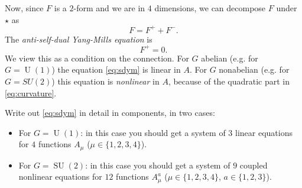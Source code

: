 \documentclass[12pt,letterpaper,reqno]{article}
\numberwithin{equation}{section}
\newcommand{\de}{\mathrm{d}}
\newcommand{\ti}[1]{\textit{#1}}
\DeclareMathOperator{\SU}{SU}
\DeclareMathOperator{\U}{U}
\begin{document}
Now, since $F$ is a $2$-form and we are in $4$ dimensions,
we can decompose $F$ under $\star$ as
\begin{equation}
  F = F^+ + F^-.
\end{equation}
The \ti{anti-self-dual Yang-Mills equation} is
\begin{equation} \label{eq:sdym}
  F^+ = 0.
\end{equation}
We view this as a condition on the connection.
For $G$ abelian (e.g. for $G = \U(1)$) the equation \eqref{eq:sdym} is linear in $A$.
For $G$ nonabelian (e.g. for $G = SU(2)$) this
equation is \ti{nonlinear} in $A$, because of the quadratic part in \eqref{eq:curvature}.

\begin{exercise} Write out \eqref{eq:sdym} in detail in components, in two cases:
\begin{itemize}
  \item For $G = \U(1)$: in this case you should get a system of $3$ linear equations for $4$ functions $A_\mu$
  ($\mu \in \{1,2,3,4\}$).
  \item For $G = \SU(2)$: in this case you should get a system of $9$ coupled nonlinear equations for
  $12$ functions $A^a_\mu$ ($\mu \in \{1,2,3,4\}$, $a \in \{1,2,3\}$).
\end{itemize}
\end{exercise}
\end{document}
